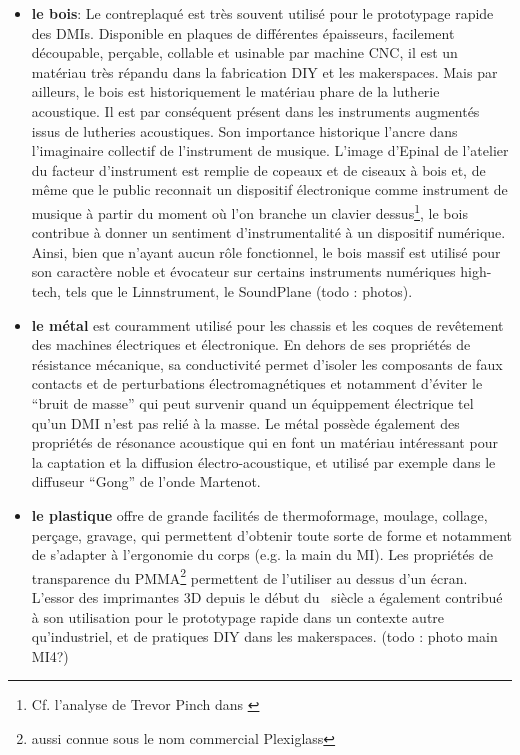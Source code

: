 \vspace{-1em}
\begin{itemize}[noitemsep]
	\item \textbf{le bois}: Le contreplaqué est très souvent utilisé pour le prototypage rapide des \glspl{DMI}. Disponible en plaques de différentes épaisseurs, facilement découpable, perçable, collable et usinable par machine \gls{CNC}, il est un matériau très répandu dans la fabrication \gls{DIY} et les \glspl{makerspace}. Mais par ailleurs, le bois est historiquement le matériau phare de la lutherie acoustique. Il est par conséquent présent dans les instruments augmentés issus de lutheries acoustiques. Son importance historique l'ancre dans l'imaginaire collectif de l'instrument de musique. L'image d'Epinal de l'atelier du facteur d'instrument est remplie de copeaux et de ciseaux à bois et, de même que le public reconnait un dispositif électronique comme instrument de musique à partir du moment où l'on branche un clavier dessus\footnote{Cf. l'analyse de Trevor Pinch dans \cite{pinch_why_2001}}, le bois contribue à donner un sentiment d'instrumentalité à un dispositif numérique. Ainsi, bien que n'ayant aucun rôle fonctionnel, le bois massif est utilisé pour son caractère noble et évocateur sur certains instruments numériques high-tech, tels que le Linnstrument, le SoundPlane (todo : photos).
	\item \textbf{le métal} est couramment utilisé pour les chassis et les coques de revêtement des machines électriques et électronique. En dehors de ses propriétés de résistance mécanique, sa conductivité permet d'isoler les composants de faux contacts et de perturbations électromagnétiques et notamment d'éviter le ``bruit de masse'' qui peut survenir quand un équippement électrique tel qu'un \gls{DMI} n'est pas relié à la masse. Le métal possède également des propriétés de résonance acoustique qui en font un matériau intéressant pour la captation et la diffusion électro-acoustique, et utilisé par exemple dans le diffuseur ``Gong'' de l'onde Martenot.
	\item \textbf{le plastique} offre de grande facilités de thermoformage, moulage, collage, perçage, gravage, qui permettent d'obtenir toute sorte de forme et notamment de s'adapter à l'ergonomie du corps (e.g. la main du MI). Les propriétés de transparence du \gls{PMMA}\footnote{aussi connue sous le nom commercial Plexiglass} permettent de l'utiliser au dessus d'un écran. L'essor des imprimantes 3D depuis le début du ~siècle a également contribué à son utilisation pour le prototypage rapide dans un contexte autre qu'industriel, et de pratiques \gls{DIY} dans les \glspl{makerspace}. (todo : photo main MI4?)

\end{itemize}
